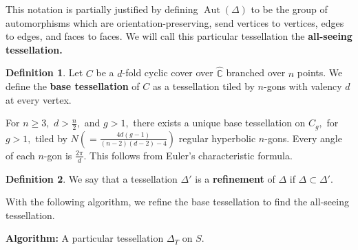 \documentclass[12pt,reqno]{amsart}
\DeclareMathOperator{\Aut}{Aut}
\newcommand{\C}{\mathbb{C}}
\theoremstyle{definition}
\newtheorem{defn}{Definition}
\theoremstyle{remark}
\newcommand{\DD}{\Delta\kern -8.3pt {\diamond} \kern -4.5pt \cdot \:}
\begin{document}
This notation is partially justified by defining $\Aut(\Delta)$ to be the group of automorphisms which are orientation-preserving, send vertices to vertices, edges to edges, and faces to faces. We will call this particular tessellation the \textbf{all-seeing tessellation.} 

\begin{defn} \label{defn: base tess} Let $C$ be a $d$-fold cyclic cover over $\widehat{\C}$ branched over $n$ points. We define the \textbf{base tessellation} of $C$ as a tessellation tiled by $n$-gons with valency $d$ at every vertex. \end{defn}

For $n \geq 3,$ $d > \frac{n}{2},$ and $g > 1,$ there exists a unique base tessellation on $C_g,$ for $g > 1,$ tiled by $N (= \frac{4 d (g - 1)}{(n - 2) (d - 2) - 4})$ regular hyperbolic $n$-gons. Every angle of each $n$-gon is $\frac{2 \pi}{d}.$ This follows from Euler's characteristic formula.

\begin{defn} We say that a tessellation $\Delta'$ is a \textbf{refinement} of $\Delta$ if $\Delta \subset \Delta'$. \end{defn}

With the following algorithm, we refine the base tessellation to find the all-seeing tessellation. 



\textbf{Algorithm:} A particular tessellation $\Delta_T$ on $S$.


\end{document}

